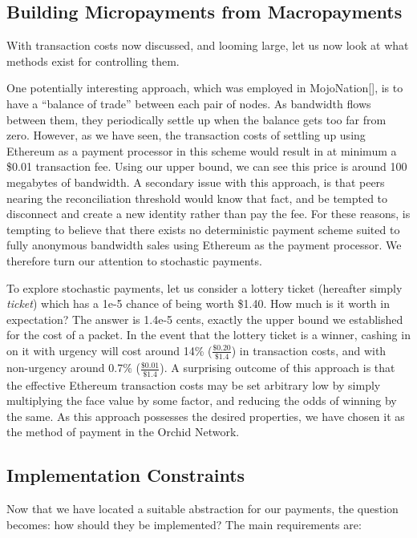 \documentclass{article}
\newcommand{\mesh}{Orchid}
\begin{document}
\subsection{Building Micropayments from Macropayments}

With transaction costs now discussed, and looming large, let us now look at what methods exist for controlling them.

One potentially interesting approach, which was employed in MojoNation[\cite{mojonation}], is to have a ``balance of trade'' between each pair of nodes. As bandwidth flows between them, they periodically settle up when the balance gets too far from zero. However, as we have seen, the transaction costs of settling up using Ethereum as a payment processor in this scheme would result in at minimum a \$0.01 transaction fee. Using our upper bound, we can see this price is around 100 megabytes of bandwidth. A secondary issue with this approach, is that peers nearing the reconciliation threshold would know that fact, and be tempted to disconnect and create a new identity rather than pay the fee. For these reasons, is tempting to believe that there exists no deterministic payment scheme suited to fully anonymous bandwidth sales using Ethereum as the payment processor. We therefore turn our attention to stochastic payments.

To explore stochastic payments, let us consider a lottery ticket (hereafter simply \emph{ticket}) which has a 1e-5 chance of being worth \$1.40. How much is it worth in expectation? The answer is 1.4e-5 cents, exactly the upper bound we established for the cost of a packet. In the event that the lottery ticket is a winner, cashing in on it with urgency will cost around 14\% ($\frac{\$0.20}{\$1.4}$) in transaction costs, and with non-urgency around 0.7\% ($\frac{\$0.01}{\$1.4}$). A surprising outcome of this approach is that the effective Ethereum transaction costs may be set arbitrary low by simply multiplying the face value by some factor, and reducing the odds of winning by the same. As this approach possesses the desired properties, we have chosen it as the method of payment in the \mesh{} Network.

\subsection{Implementation Constraints}

Now that we have located a suitable abstraction for our payments, the question becomes: how should they be implemented? The main requirements are:
\end{document}
